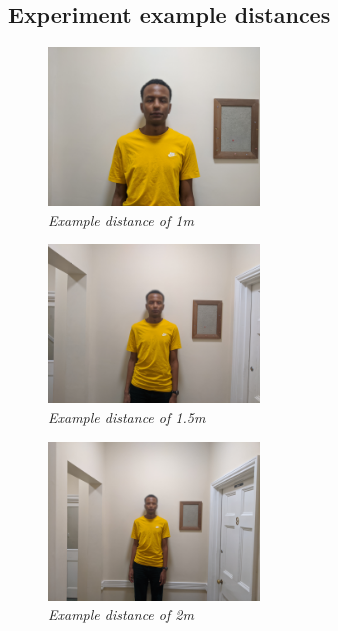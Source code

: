 \documentclass[12pt,twoside,notitlepage]{report}
\begin{document}
\begin{appendices}
\chapter{Experiment example distances}
\label{appendix:experiments}
\begin{figure}[H]
    \centering
    \includegraphics[width=0.5\textwidth]{evaluation/1.jpg}
   \caption{\textit{Example distance of 1m}}
\end{figure}
\begin{figure}[H]
    \centering
    \includegraphics[width=0.5\textwidth]{evaluation/1-5.jpg}
   \caption{\textit{Example distance of 1.5m} }
\end{figure}
\begin{figure}[H]
    \centering
    \includegraphics[width=0.5\textwidth]{evaluation/2.jpg}
    \caption{\textit{Example distance of 2m} }
\end{figure}


\end{appendices}
\end{document}
